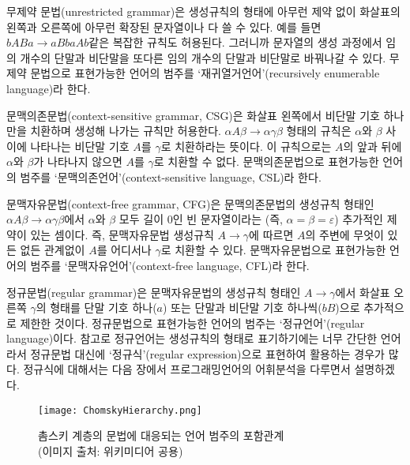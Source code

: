 무제약 문법(unrestricted grammar)은 생성규칙의 형태에 아무런 제약 없이
화살표의 왼쪽과 오른쪽에 아무런 확장된 문자열이나 다 쓸 수 있다. 예를 들면
$bABa \to aBbaAb$같은 복잡한 규칙도 허용된다. 그러니까 문자열의 생성 과정에서
임의 개수의 단말과 비단말을 또다른 임의 개수의 단말과 비단말로 바꿔나갈 수 있다.
무제약 문법으로 표현가능한 언어의 범주를
`재귀열거언어'(recursively enumerable language)라 한다.

문맥의존문법(context-sensitive grammar, CSG)은 화살표 왼쪽에서 비단말 기호 하나만을
치환하며 생성해 나가는 규칙만 허용한다. $\alpha A\beta\to\alpha\gamma\beta$ 형태의
규칙은 $\alpha$와 $\beta$ 사이에 나타나는 비단말 기호 $A$를 $\gamma$로 치환하라는 뜻이다.
이 규칙으로는 $A$의 앞과 뒤에 $\alpha$와 $\beta$가 나타나지 않으면
$A$를 $\gamma$로 치환할 수 없다. 문맥의존문법으로 표현가능한 언어의 범주를
`문맥의존언어'(context-sensitive language, CSL)라 한다.

문맥자유문법(context-free grammar, CFG)은 문맥의존문법의 생성규칙 형태인
$\alpha A\beta\to\alpha\gamma\beta$에서 $\alpha$와 $\beta$ 모두 길이 0인
빈 문자열이라는 (즉, $\alpha=\beta=\varepsilon$) 추가적인 제약이 있는 셈이다.
즉, 문맥자유문법 생성규칙 $A\to\gamma$에 따르면 $A$의 주변에 무엇이 있든 없든
관계없이 $A$를 어디서나 $\gamma$로 치환할 수 있다. 문맥자유문법으로 표현가능한
언어의 범주를 `문맥자유언어'(context-free language, CFL)라 한다.

정규문법(regular grammar)은 문맥자유문법의 생성규칙 형태인 $A\to\gamma$에서
화살표 오른쪽 $\gamma$의 형태를 단말 기호 하나($a$) 또는
단말과 비단말 기호 하나씩($bB$)으로 추가적으로 제한한 것이다.
정규문법으로 표현가능한 언어의 범주는 `정규언어'(regular language)이다. 
참고로 정규언어는 생성규칙의 형태로 표기하기에는 너무 간단한 언어라서
정규문법 대신에 `정규식'(regular expression)으로 표현하여 활용하는 경우가 많다.
정규식에 대해서는 다음 장에서 프로그래밍언어의 어휘분석을 다루면서 설명하겠다.

\begin{figure}[b]\centering
\texttt{[image: ChomskyHierarchy.png]}
\caption{촘스키 계층의 문법에 대응되는 언어 범주의 포함관계
         \label{fig:ChomskyHierarchyLang}\\
         {\scriptsize(이미지 출처: 위키미디어 공용)} }
\end{figure}

